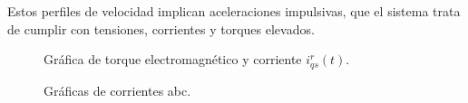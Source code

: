 \documentclass[a4paper, 10pt, onecolumn,journal]{ieeeconf}
\begin{document}
Estos perfiles de velocidad implican aceleraciones impulsivas, que el sistema trata de cumplir con tensiones, corrientes y torques elevados.
\begin{figure}[H]
	\centering
	\begin{adjustbox}{scale=0.5,max width=\columnwidth}
	\end{adjustbox}
	\caption{Gráfica de torque electromagnético y corriente $i^r_{qs}(t)$.}
	\label{Gráfica de torque electromagnético y corriente $i_{qs}$}
\end{figure}

\begin{figure}[H]
	\centering
	\begin{adjustbox}{scale=0.5,max width=\columnwidth}
	\end{adjustbox}
	\caption{Gráficas de corrientes abc.}
	\label{Gráficas de corrientes $i_{abc}$}
\end{figure}
\end{document}
